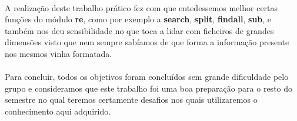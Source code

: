 \documentclass[11pt,a4paper]{report}
\begin{document}
\paragraph{}
A realização deste trabalho prático fez com que entedessemos melhor certas funções do módulo \textbf{re}, como por exemplo a \textbf{search}, \textbf{split}, \textbf{findall}, \textbf{sub}, e também nos deu sensibilidade no que toca a lidar com ficheiros de grandes dimensões visto que nem sempre sabíamos de que forma a informação presente nos mesmos vinha formatada. 
\paragraph{}
Para concluir, todos os objetivos foram concluídos sem grande dificuldade pelo grupo e consideramos que este trabalho foi uma boa preparação para o resto do semestre no qual teremos certamente desafios nos quais utilizaremos o conhecimento aqui adquirido. 
\end{document}
